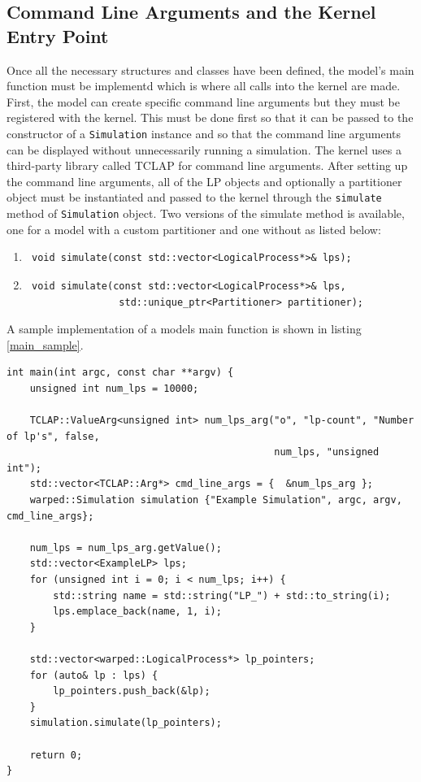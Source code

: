 \documentclass[11pt]{book}
\begin{document}
\subsection{Command Line Arguments and the Kernel Entry Point}

Once all the necessary structures and classes have been defined, the model's main function
must be implementd which is where all calls into the kernel are made.  First, the model can create
specific command line arguments but they must be registered with the kernel.  This must be done
first so that it can be passed to the constructor of a \texttt{Simulation} instance and so that
the command line arguments can be displayed without unnecessarily running a simulation.  The
kernel uses a third-party library called TCLAP for command line arguments.  After setting
up the command line arguments, all of the LP objects and optionally a partitioner object must
be instantiated and passed to the kernel through the \texttt{simulate} method of
\texttt{Simulation} object.  Two versions of the simulate method is available, one for a model
with a custom partitioner and one without as listed below:

\begin{enumerate}
    \item \begin{verbatim} void simulate(const std::vector<LogicalProcess*>& lps); \end{verbatim}
    \item \begin{verbatim} void simulate(const std::vector<LogicalProcess*>& lps,
                std::unique_ptr<Partitioner> partitioner); \end{verbatim}
\end{enumerate}

\noindent
A sample implementation of a models main function is shown in listing \ref{main_sample}.

\begin{lstlisting}[caption=Exmple \textsc{warped2} Main Definition, label=main_sample, float]
int main(int argc, const char **argv) {
    unsigned int num_lps = 10000;

    TCLAP::ValueArg<unsigned int> num_lps_arg("o", "lp-count", "Number of lp's", false,
                                              num_lps, "unsigned int");
    std::vector<TCLAP::Arg*> cmd_line_args = {  &num_lps_arg };
    warped::Simulation simulation {"Example Simulation", argc, argv, cmd_line_args};

    num_lps = num_lps_arg.getValue();
    std::vector<ExampleLP> lps;
    for (unsigned int i = 0; i < num_lps; i++) {
        std::string name = std::string("LP_") + std::to_string(i);
        lps.emplace_back(name, 1, i);
    }

    std::vector<warped::LogicalProcess*> lp_pointers;
    for (auto& lp : lps) {
        lp_pointers.push_back(&lp);
    }
    simulation.simulate(lp_pointers);

    return 0;
}
\end{lstlisting}
\end{document}

